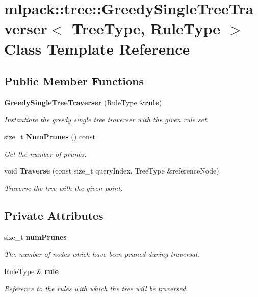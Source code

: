 \section{mlpack\+:\+:tree\+:\+:Greedy\+Single\+Tree\+Traverser$<$ Tree\+Type, Rule\+Type $>$ Class Template Reference}
\label{classmlpack_1_1tree_1_1GreedySingleTreeTraverser}
\subsection*{Public Member Functions}
\begin{DoxyCompactItemize}
\item 
{\bf Greedy\+Single\+Tree\+Traverser} (Rule\+Type \&{\bf rule})
\begin{DoxyCompactList}\small\item\em Instantiate the greedy single tree traverser with the given rule set. \end{DoxyCompactList}\item 
size\+\_\+t {\bf Num\+Prunes} () const 
\begin{DoxyCompactList}\small\item\em Get the number of prunes. \end{DoxyCompactList}\item 
void {\bf Traverse} (const size\+\_\+t query\+Index, Tree\+Type \&reference\+Node)
\begin{DoxyCompactList}\small\item\em Traverse the tree with the given point. \end{DoxyCompactList}\end{DoxyCompactItemize}
\subsection*{Private Attributes}
\begin{DoxyCompactItemize}
\item 
size\+\_\+t {\bf num\+Prunes}
\begin{DoxyCompactList}\small\item\em The number of nodes which have been pruned during traversal. \end{DoxyCompactList}\item 
Rule\+Type \& {\bf rule}
\begin{DoxyCompactList}\small\item\em Reference to the rules with which the tree will be traversed. \end{DoxyCompactList}\end{DoxyCompactItemize}



